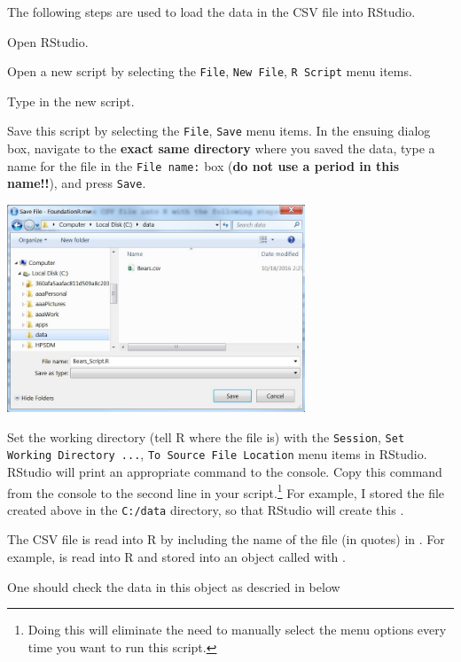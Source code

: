 \documentclass[10pt,openany]{book}\usepackage[]{graphicx}\usepackage[]{color}
\begin{document}
The following steps are used to load the data in the CSV file into RStudio.

\begin{Itemize}
  \item Open RStudio.
  \item Open a new script by selecting the \verb"File", \verb"New File", \verb"R Script" menu items.
  \item Type  in the new script.
  \item Save this script by selecting the \verb"File", \verb"Save" menu items.  In the ensuing dialog box, navigate to the \textbf{exact same directory} where you saved the data, type a name for the file in the \verb"File name:" box (\textbf{do not use a period in this name!!}), and press \verb"Save".

\begin{center}
  \includegraphics[width=3.5in]{Figs/Data_File_3.jpg}
\end{center}

  \item Set the working directory (tell R where the file is) with the \verb"Session", \verb"Set Working Directory ...", \verb"To Source File Location" menu items in RStudio.  RStudio will print an appropriate  command to the console.  Copy this command from the console to the second line in your script.\footnote{Doing this will eliminate the need to manually select the menu options every time you want to run this script.}  For example, I stored the file created above in the \verb"C:/data" directory, so that RStudio will create this .
  \item The CSV file is read into R by including the name of the file (in quotes) in .  For example,  is read into R and stored into an object called  with .


  \item One should check the data in this object as descried in  below
\end{Itemize}
\end{document}
